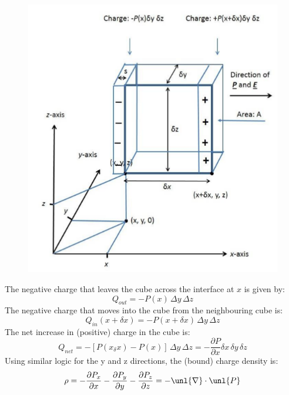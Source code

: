\documentclass[a4paper, 11pt, normalem]{report}
\newcommand\p{\partial}
\newcommand\del{\unl{\nabla}}
\begin{document}
\begin{figure}
	\centering
	\includegraphics[scale=0.38]{dibox.png}
\end{figure}

The negative charge that leaves the cube across the interface at $x$ is given by:
\begin{equation}
    Q_{out} = -P(x)\,\Delta y \,\Delta z
\end{equation}
The negative charge that moves into the cube from the neighbouring cube is:
\begin{equation}
    Q_{in}(x+\delta x) = -P(x+\delta x)\,\Delta y \, \Delta z
\end{equation}
The net increase in (positive) charge in the cube is:
\begin{equation}
    Q_{net} = -\left[P(x_\delta x)-P(x)\right]\,\Delta y\,\Delta z = -\frac{\p P}{\p x} \delta x \, \delta y \, \delta z
\end{equation}
Using similar logic for the y and z directions, the (bound) charge density is:
\begin{equation}
    \rho = -\frac{\p P_x}{\p x} - \frac{\p P_y}{\p y} - \frac{\p P_z}{\p z} = -\del\cdot\unl{P}
\end{equation}
\end{document}
